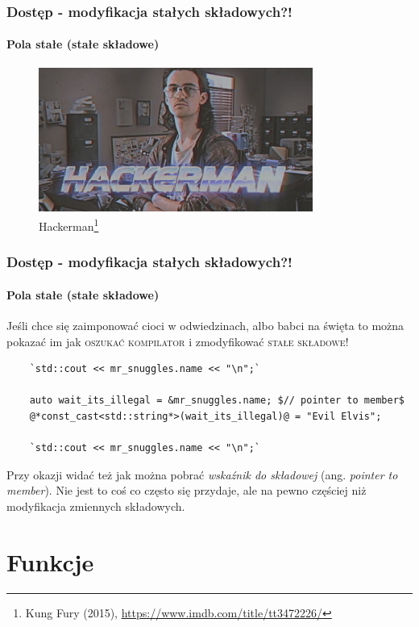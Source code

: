\documentclass[aspectratio=169]{beamer}
\begin{document}
\begin{frame}
    \frametitle{Dostęp - modyfikacja stałych składowych?!}
    \framesubtitle{Pola stałe (stałe składowe)}

    \begin{figure}[!htp]
        \centering
        \includegraphics[width=9cm]{hackerman}
        \caption{Hackerman\footnote{Kung Fury (2015), \url{https://www.imdb.com/title/tt3472226/}}}
    \end{figure}
\end{frame}

\begin{frame}[fragile]
    \frametitle{Dostęp - modyfikacja stałych składowych?!}
    \framesubtitle{Pola stałe (stałe składowe)}

    Jeśli chce się zaimponować cioci w odwiedzinach, albo babci na święta to
    można pokazać im jak \textsc{oszukać kompilator} i zmodyfikować
    \textsc{stałe składowe}!

    {\scriptsize
    \begin{lstlisting}
    `std::cout << mr_snuggles.name << "\n";`

    auto wait_its_illegal = &mr_snuggles.name; $// pointer to member$
    @*const_cast<std::string*>(wait_its_illegal)@ = "Evil Elvis";

    `std::cout << mr_snuggles.name << "\n";`
    \end{lstlisting}}

    {\tiny Przy okazji widać też jak można pobrać \emph{wskaźnik do składowej}
    (ang. \emph{pointer to member}). Nie jest to coś co często się przydaje, ale
    na pewno częściej niż modyfikacja zmiennych składowych.}
\end{frame}

\section{Funkcje}
\end{document}

